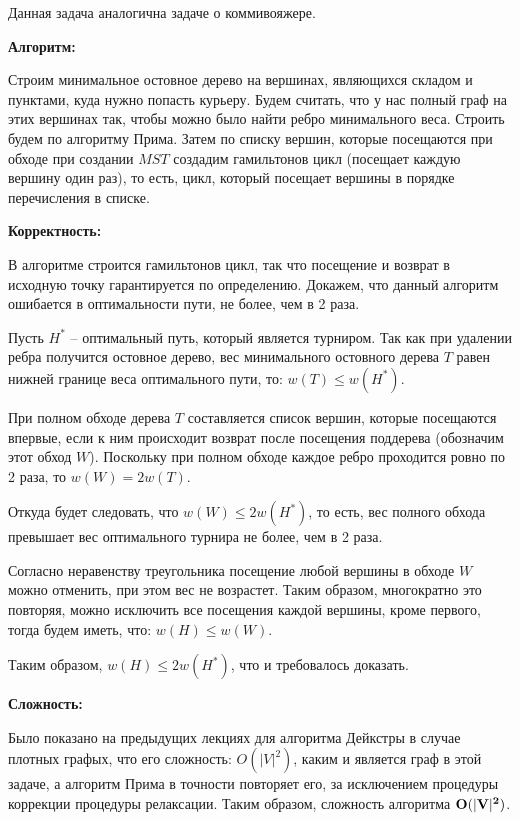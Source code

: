 \documentclass[12pt]{extreport}
\begin{document}
Данная задача аналогична задаче о коммивояжере.

{\bf Алгоритм:} 

Строим минимальное остовное дерево на вершинах, являющихся складом и пунктами, куда нужно попасть курьеру. Будем считать, что у нас полный граф на этих вершинах так, чтобы можно было найти ребро минимального веса. Строить будем по алгоритму Прима. Затем по списку вершин, которые посещаются при обходе при создании $MST$ создадим гамильтонов цикл (посещает каждую вершину один раз), то есть, цикл, который посещает вершины в порядке перечисления в списке.  

\bigskip 
{\bf Корректность:}

В алгоритме строится гамильтонов цикл, так что посещение и возврат в исходную точку гарантируется по определению. Докажем, что данный алгоритм ошибается в оптимальности пути, не более, чем в 2 раза. 

Пусть $H^{*}$ -- оптимальный путь, который является турниром. Так как при удалении ребра получится остовное дерево, вес минимального остовного дерева $T$ равен нижней границе веса оптимального пути, то:  $w(T) \leq w(H^{*})$.

При полном обходе дерева $T$ составляется список вершин, которые посещаются впервые, если к ним происходит возврат после посещения поддерева (обозначим этот обход $W$). Поскольку при полном обходе каждое ребро проходится ровно по 2 раза, то $w(W) = 2 w(T)$.

Откуда будет следовать, что $w(W) \leq 2w(H^{*})$, то есть, вес полного обхода превышает вес оптимального турнира не более, чем в 2 раза. 

Согласно неравенству треугольника посещение любой вершины в обходе $W$ можно отменить,  при этом вес не возрастет. Таким образом, многократно это повторяя, можно исключить все посещения каждой вершины, кроме первого, тогда будем иметь, что: $w(H) \leq w(W)$.

Таким образом, $w(H) \leq 2w(H^{*})$, что и требовалось доказать. 

\bigskip 
{\bf Сложность:} 

 Было показано на предыдущих лекциях для алгоритма Дейкстры в случае плотных графых, что его сложность: $ O(|V|^2)$, каким и является граф в этой задаче, а алгоритм Прима в точности повторяет его, за исключением процедуры коррекции процедуры релаксации. Таким образом, сложность алгоритма $ \bf O(|V|^2)$.
\end{document}
